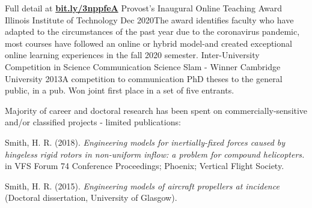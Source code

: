 \vspace{.1cm}
\begin{cventries}
      \cventry
    {Full detail at \textbf{\href{https://www.iit.edu/news/engineering-faculty-member-awarded-provosts-inaugural-online-teaching-award?fbclid=IwAR1rnJJH0X0j_ZoT1OAlPZm4HNpREQp_A0Hx-8LIhM_4BP7b8K9ChcNPFFI}{bit.ly/3nppfeA}}} %
    {Provost's Inaugural Online Teaching Award} %
    {Illinois Institute of Technology} %
    {Dec 2020}{The award identifies faculty who have adapted to the circumstances of the past year due to the coronavirus pandemic, most courses have followed an online or hybrid model-and created exceptional online learning experiences in the fall 2020 semester.}
    \cventry
    {Inter-University Competition in Science Communication} %
    {Science Slam - Winner} %
    {Cambridge University} %
    {2013}{A competition to communication PhD theses to the general public, in a pub. Won joint first place in a set of five entrants.}
   
\end{cventries}


{\small Majority of career and doctoral research has been spent on commercially-sensitive and/or classified projects - limited publications:}\vspace{.25cm}

\begin{cvitems}
	\item Smith, H. R. (2018). \textsl{Engineering models for inertially-fixed forces caused by hingeless rigid rotors in non-uniform inflow: a problem for compound helicopters.} in VFS Forum 74 Conference Proceedings; Phoenix; Vertical Flight Society. 
	\item Smith, H. R. (2015). \textsl{Engineering models of aircraft propellers at incidence} (Doctoral dissertation, University of Glasgow).	
\end{cvitems}

